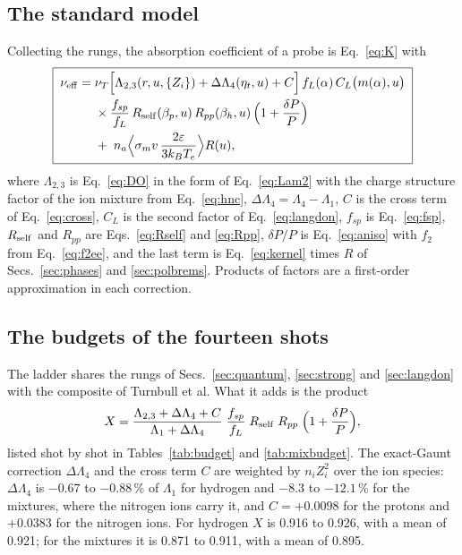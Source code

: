 \documentclass[11pt]{article}
\numberwithin{equation}{section}
\newcommand{\kB}{k_B}
\newcommand{\nueff}{\nu_{\rm eff}}
\begin{document}
\subsection{The standard model}
\label{sec:stdmodel}
Collecting the rungs, the absorption coefficient of a probe is Eq.~\eqref{eq:K} with
\begin{equation}
\boxed{\;\begin{aligned}
\nueff={}&\nu_T\Big[\Lambda_{2,3}(r,u,\{Z_i\})+\Delta\Lambda_4(\eta_t,u)+C\Big]\,
f_L(\alpha)\,C_L\big(m(\alpha),u\big)\\
&\times\frac{f_{sp}}{f_L}\,R_{\rm self}(\beta_p,u)\,R_{pp}(\beta_h,u)\,\Big(1+\frac{\delta P}{P}\Big)\\
&+\;n_a\Big\langle\sigma_mv\,\frac{2\varepsilon}{3\kB T_e}\Big\rangle R(u),
\end{aligned}\;}
\label{eq:standard}
\end{equation}
where $\Lambda_{2,3}$ is Eq.~\eqref{eq:DO} in the form of Eq.~\eqref{eq:Lam2} with the charge structure
factor of the ion mixture from Eq.~\eqref{eq:hnc}, $\Delta\Lambda_4=\Lambda_4-\Lambda_1$, $C$ is the cross
term of Eq.~\eqref{eq:cross}, $C_L$ is the second factor of Eq.~\eqref{eq:langdon}, $f_{sp}$ is
Eq.~\eqref{eq:fsp}, $R_{\rm self}$ and $R_{pp}$ are Eqs.~\eqref{eq:Rself} and \eqref{eq:Rpp}, $\delta P/P$ is
Eq.~\eqref{eq:aniso} with $f_2$ from Eq.~\eqref{eq:f2ee}, and the last term is Eq.~\eqref{eq:kernel} times $R$ of Secs.~\ref{sec:phases} and \ref{sec:polbrems}.
Products of factors are a first-order approximation in each correction.

\subsection{The budgets of the fourteen shots}
\label{sec:budgets}
The ladder shares the rungs of Secs.~\ref{sec:quantum}, \ref{sec:strong} and \ref{sec:langdon} with the composite of Turnbull et al. What it adds is the product
\begin{equation}
X=\frac{\Lambda_{2,3}+\Delta\Lambda_4+C}{\Lambda_1+\Delta\Lambda_4}\;\frac{f_{sp}}{f_L}\;R_{\rm self}\;R_{pp}\;
\Big(1+\frac{\delta P}{P}\Big),
\label{eq:X}
\end{equation}
listed shot by shot in Tables~\ref{tab:budget} and \ref{tab:mixbudget}. The exact-Gaunt correction
$\Delta\Lambda_4$ and the cross term $C$ are weighted by $n_iZ_i^2$ over the ion species: $\Delta\Lambda_4$ is
$-0.67$ to $-0.88$\,\% of $\Lambda_1$ for hydrogen and $-8.3$ to $-12.1$\,\% for the mixtures, where the
nitrogen ions carry it, and $C=+0.0098$ for the protons and $+0.0383$ for the nitrogen ions. For
hydrogen $X$ is 0.916 to 0.926, with a mean of 0.921; for the mixtures it is 0.871 to 0.911, with a mean of 0.895.
\end{document}
